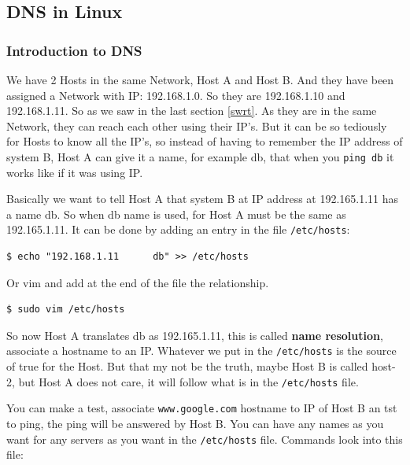 \documentclass{article}
\newenvironment{codetemplate}[1][]{%
  \mybasecolorbox[#1]
  \itshape
}{%
  \endmybasecolorbox
}
\begin{document}
\subsection{DNS in Linux}

\subsubsection{Introduction to DNS}

We have 2 Hosts in the same Network, Host A and Host B. And they have been assigned a Network with IP: 192.168.1.0. So they are 192.168.1.10 and 192.168.1.11. So as we saw in the last section \ref{swrt}. As they are in the same Network, they can reach each other using their IP's. But it can be so tediously for Hosts to know all the IP's, so instead of having to remember the IP address of system B, Host A can give it a name, for example db, that when you \verb|ping db| it works like if it was using IP.

Basically we want to tell Host A that system B at IP address at 192.165.1.11 has a name db. So when db name is used, for Host A must be the same as 192.165.1.11. It can be done by adding an entry in the file \verb|/etc/hosts|:

\begin{codetemplate}{}
\begin{verbatim}
$ echo "192.168.1.11      db" >> /etc/hosts
\end{verbatim}
\end{codetemplate}

Or vim and add at the end of the file the relationship.
\begin{codetemplate}{}
\begin{verbatim}
$ sudo vim /etc/hosts
\end{verbatim}
\end{codetemplate}

So now Host A translates db as 192.165.1.11, this is called \textbf{name resolution}, associate a hostname to an IP. Whatever we put in the \verb|/etc/hosts| is the source of true for the Host. But that my not be the truth, maybe Host B is called host-2, but Host A does not care, it will follow what is in the \verb|/etc/hosts| file. 

You can make a test, associate \verb|www.google.com| hostname to IP of Host B an tst to ping, the ping will be answered by Host B. You can have any names as you want for any servers as you want in the \verb|/etc/hosts| file. Commands look into this file:
\end{document}
